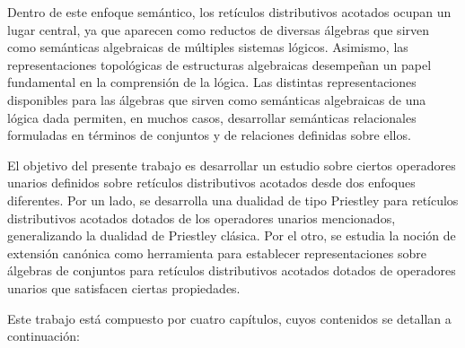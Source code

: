 \documentclass[12pt]{book}
\begin{document}
Dentro de este enfoque semántico, los retículos distributivos acotados ocupan un lugar central, ya que aparecen como reductos de diversas álgebras que sirven como semánticas algebraicas de múltiples sistemas lógicos. Asimismo, las representaciones topológicas de estructuras algebraicas desempeñan un papel fundamental en la comprensión de la lógica. Las distintas representaciones disponibles para las álgebras que sirven como semánticas algebraicas de una lógica dada permiten, en muchos casos, desarrollar semánticas relacionales formuladas en términos de conjuntos y de relaciones definidas sobre ellos. 
\vspace{0.2cm}



El objetivo del presente trabajo es desarrollar un estudio sobre ciertos operadores unarios definidos sobre retículos distributivos acotados desde dos enfoques diferentes. Por un lado, se desarrolla una dualidad de tipo Priestley para retículos distributivos acotados dotados de los operadores unarios mencionados, generalizando la dualidad de Priestley clásica. Por el otro, se estudia la noción de extensión canónica como herramienta para establecer representaciones sobre álgebras de conjuntos para retículos distributivos acotados dotados de operadores unarios que satisfacen ciertas propiedades.



Este trabajo está compuesto por cuatro capítulos, cuyos contenidos se detallan a continuación:
\end{document}
